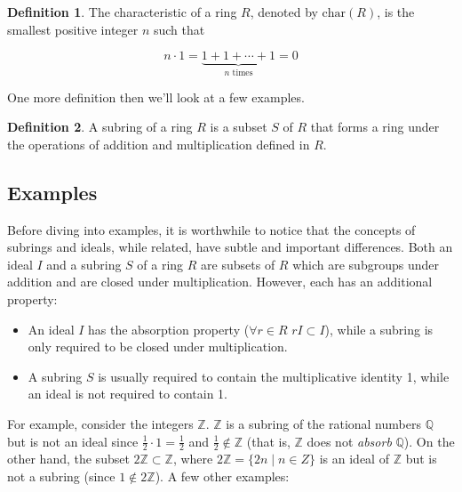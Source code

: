 \documentclass{article}
\theoremstyle{definition}
\newtheorem{definition}{Definition}[section]
\begin{document}
\begin{definition}
The characteristic of a ring $R$, denoted by $\text{char}(R)$, is
the smallest positive integer $n$ such that 

\begin{equation*}
n \cdot 1 = \underbrace{1 + 1 + \cdots + 1}_{n \text{ times}} = 0
\end{equation*}
\end{definition}


\bigskip
\noindent
One more definition then we'll look at a few examples.

\begin{definition}
A subring of a ring $R$ is a subset $S$ of $R$ that forms a ring
under the operations of addition and multiplication defined in
$R$. 
\end{definition}

\subsection{Examples}
Before diving into examples, it is worthwhile to notice that the
concepts of subrings and ideals, while related, have subtle and
important differences.  Both an ideal $I$ and a subring $S$ of a
ring $R$ are subsets of $R$ which are subgroups under addition
and are closed under multiplication. However, each has an
additional property:

\begin{itemize}
\item An ideal $I$ has the absorption property ($\forall r \in R$
$rI \subset I$), while a subring is only required to be closed
under multiplication.
\item A subring $S$ is usually required to contain the
multiplicative identity 1, while an ideal is not required to
contain 1. 
\end{itemize}

\noindent
For example, consider the integers $\mathbb{Z}$.  $\mathbb{Z}$ is
a subring of the rational numbers $\mathbb{Q}$ but is not an
ideal since $\frac{1}{2} \cdot 1 = \frac{1}{2}$ and $\frac{1}{2}
\notin \mathbb{Z}$ (that is, $\mathbb{Z}$ does not \emph{absorb}
$\mathbb{Q}$). On the other hand, the subset $2\mathbb{Z} \subset
\mathbb{Z}$, where $2\mathbb{Z} = \{2n \mid n \in Z\}$ is an
ideal of $\mathbb{Z}$ but is not a subring (since $1 \notin
2\mathbb{Z}$). A few other examples:
\end{document}
